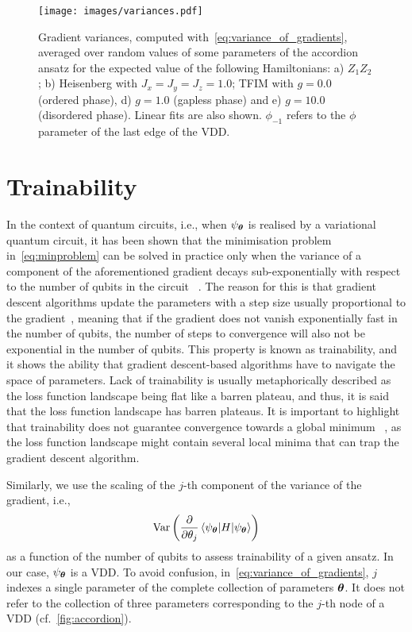 \documentclass{ieeeaccess}
\begin{document}
\begin{figure*}[t]
    \centering
    \texttt{[image: images/variances.pdf]}
    \caption{Gradient variances, computed with~\cref{eq:variance_of_gradients}, averaged over random values of some parameters of the accordion ansatz for the expected value of the following Hamiltonians: a) $Z_1Z_2$; b) Heisenberg with $J_x=J_y=J_z=1.0$; TFIM with $g=0.0$ (ordered phase), d) $g=1.0$ (gapless phase) and e) $g=10.0$ (disordered phase).
    Linear fits are also shown. $\phi_{-1}$ refers to the $\phi$ parameter of the last edge of the VDD.}
    \label{fig:variances}
\end{figure*}


\section{Trainability}\label{sec:trainability}

In the context of quantum circuits, i.e., when $\psi_{\vb*{\theta}}$ is realised by a variational quantum circuit, it has been shown that the minimisation problem in~\cref{eq:minproblem} can be solved in practice only when the variance of a component of the aforementioned gradient decays sub-exponentially with respect to the number of qubits in the circuit ~\cite{mcclean2018barren}.
The reason for this is that gradient descent algorithms update the parameters with a step size usually proportional to the gradient~\cite{wang1989training}, meaning that if the gradient does not vanish exponentially fast in the number of qubits, the number of steps to convergence will also not be exponential in the number of qubits.
This property is known as trainability, and it shows the ability that gradient descent-based algorithms have to navigate the space of parameters.
Lack of trainability is usually metaphorically described as the loss function landscape being flat like a barren plateau, and thus, it is said that the loss function landscape has barren plateaus.
It is important to highlight that trainability does not guarantee convergence towards a global minimum ~\cite{anschuetz2022traps}, as the loss function landscape might contain several local minima that can trap the gradient descent algorithm.



Similarly, we use the scaling of the $j$-th component of the variance of the gradient, i.e.,
\begin{align}
    \text{Var}\left(\pdv{\theta_j}\expval{H}{\psi_{\vb*{\theta}}}\right)\label{eq:variance_of_gradients}
\end{align}
as a function of the number of qubits to assess trainability of a given ansatz.
In our case, $\psi_{\vb*{\theta}}$ is a VDD.
To avoid confusion, in~\cref{eq:variance_of_gradients}, $j$ indexes a single parameter of the complete collection of parameters $\vb*{\theta}$.
It does not refer to the collection of three parameters corresponding to the $j$-th node of a VDD (cf.~\cref{fig:accordion}).
\end{document}
